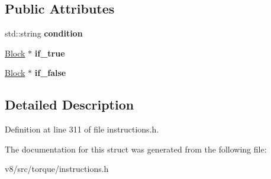 \subsection*{Public Attributes}
\begin{DoxyCompactItemize}
\item 
\mbox{\label{structv8_1_1internal_1_1torque_1_1ConstexprBranchInstruction_af868912893cd43301886ee7853e2c800}} 
std\+::string {\bfseries condition}
\item 
\mbox{\label{structv8_1_1internal_1_1torque_1_1ConstexprBranchInstruction_a10448c4d3ff6da67caa1b77d3f3cd8c4}} 
\mbox{\hyperlink{classv8_1_1internal_1_1torque_1_1Block}{Block}} $\ast$ {\bfseries if\+\_\+true}
\item 
\mbox{\label{structv8_1_1internal_1_1torque_1_1ConstexprBranchInstruction_a0d644add071f9ca4bd9499bfedf7d73e}} 
\mbox{\hyperlink{classv8_1_1internal_1_1torque_1_1Block}{Block}} $\ast$ {\bfseries if\+\_\+false}
\end{DoxyCompactItemize}


\subsection{Detailed Description}


Definition at line 311 of file instructions.\+h.



The documentation for this struct was generated from the following file\+:\begin{DoxyCompactItemize}
\item 
v8/src/torque/instructions.\+h\end{DoxyCompactItemize}
